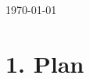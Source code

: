 \documentclass[a4paper]{article}
\begin{document}
\begin{titlepage}

{\large \today}\\[3cm] %



 

\vfill %

\end{titlepage}
\section*{1. Plan}
\end{document}
